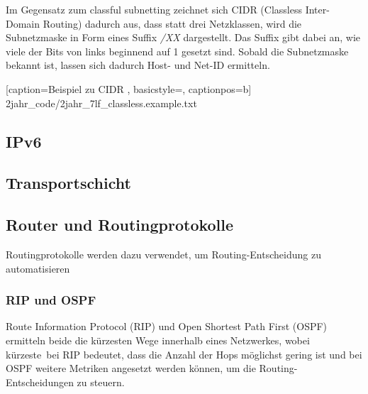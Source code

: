 Im Gegensatz zum classful subnetting zeichnet sich CIDR (Classless Inter-Domain Routing) dadurch aus, dass statt drei Netzklassen, wird die Subnetzmaske in Form eines Suffix {\it /XX} dargestellt. Das Suffix gibt dabei an, wie viele der Bits von links beginnend auf 1 gesetzt sind. Sobald die Subnetzmaske bekannt ist, lassen sich dadurch Host- und Net-ID ermitteln.


	[caption={Beispiel zu CIDR}
	\label{lst:7lf_classless.example},
	basicstyle=\small,
	captionpos=b]
	{2jahr_code/2jahr_7lf_classless.example.txt}
	

\subsection{IPv6}




\subsection{Transportschicht}



\subsection{Router und Routingprotokolle}

Routingprotokolle werden dazu verwendet, um Routing-Entscheidung zu automatisieren

\subsubsection{RIP und OSPF}

Route Information Protocol (RIP) und Open Shortest Path First (OSPF) ermitteln beide die kürzesten Wege innerhalb eines Netzwerkes, wobei \ql kürzeste\qr\ bei RIP bedeutet, dass die Anzahl der Hops möglichst gering ist und bei OSPF weitere Metriken angesetzt werden können, um die Routing-Entscheidungen zu steuern.

